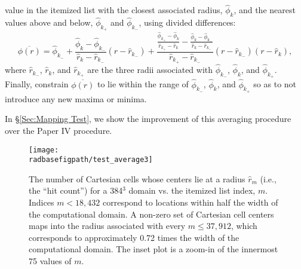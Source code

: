 \begin{description}
\begin{enumerate}
  value in the itemized list with the closest associated radius, $\hat\phi_k$,
  and the nearest values above and below, $\hat\phi_{k_+}$ and $\hat\phi_{k_-}$,
  using divided differences:
  \begin{equation}
    \overline{\phi(r)} = \hat\phi_{k_-} + \frac{\hat\phi_k-\hat\phi_{k_-}}{\hat r_k-\hat r_{k_-}}(r-\hat r_{k_-}) + \frac{\frac{\hat\phi_{k_+}-\hat\phi_k}{\hat r_{k_+}-\hat r_k}-\frac{\hat\phi_k-\hat\phi_{k_-}}{\hat r_k-\hat r_{k_-}}}{\hat r_{k_+}-\hat r_{k_-}}(r-\hat r_{k_-})(r-\hat r_k)\nonumber,
  \end{equation}
  where $\hat r_{k_-}$, $\hat r_k$, and $\hat r_{k_+}$ are the three radii
  associated with $\hat\phi_{k_-}$, $\hat\phi_k$, and  $\hat\phi_{k_+}$.
  Finally, constrain $\overline{\phi(r)}$ to lie within the range of
  $\hat\phi_{k_-}$, $\hat\phi_k$, and $\hat\phi_{k_+}$ so as to not introduce
  any new maxima or minima.
\end{enumerate}
  In \S \ref{Sec:Mapping Test}, we show the improvement of this averaging procedure 
  over the Paper IV procedure.
\end{description}
\begin{figure}[h]
\centering
\texttt{[image: \\radbasefigpath/test\_average3]}
\caption{\label{Fig:test_average3}
The number of Cartesian cells whose centers lie
at a radius $\hat r_m$ (i.e., the ``hit count'') for a 384$^3$ domain vs. the
itemized list index, $m$.  
Indices $m<18,432$ correspond to locations within half the width 
of the computational domain.  A non-zero set of Cartesian cell centers maps 
into the radius associated with every $m\le 37,912$, which corresponds to 
approximately 0.72 times the width of the computational domain.  The inset plot
is a zoom-in of the innermost 75 values of $m$.}
\end{figure}
